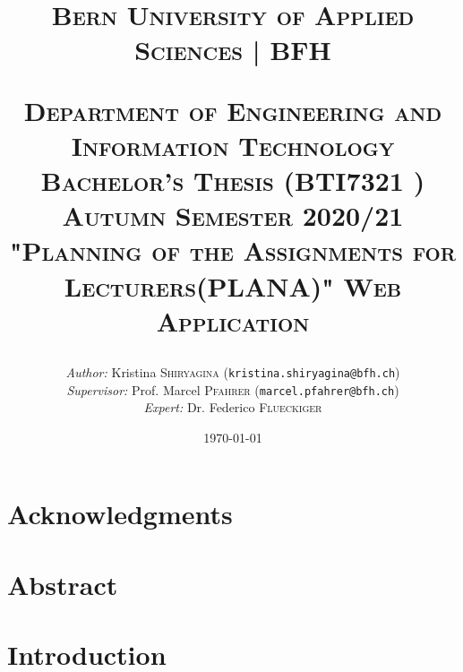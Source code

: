 \documentclass{scrartcl}
\begin{document}
\begin{titlepage}


\title{\textsc{\LARGE Bern University of Applied Sciences | BFH }\\[1cm]
\begin{center}
\end{center}
\textsc{\small Department of Engineering and Information Technology}\\
\textsc{\small Bachelor's Thesis (BTI7321 ) Autumn Semester 2020/21}\\[1cm]
\textsc{"Planning of the Assignments for Lecturers(PLANA)" Web Application}}
\date{\today}   %
\author{\textit{Author: }Kristina \textsc{Shiryagina} (\texttt{kristina.shiryagina@bfh.ch}) \\
 \textit{Supervisor: } Prof. Marcel \textsc{Pfahrer}  (\texttt{marcel.pfahrer@bfh.ch})\\
 \textit{Expert: } Dr. Federico \textsc {Flueckiger}   \\
 }
\maketitle	

\newpage


	
\tableofcontents
\clearpage
\end{titlepage}

\setcounter{secnumdepth}{-2}%





\section{Acknowledgments}


\section{Abstract}


\setcounter{secnumdepth}{2}  %



\section{Introduction}
\end{document}
